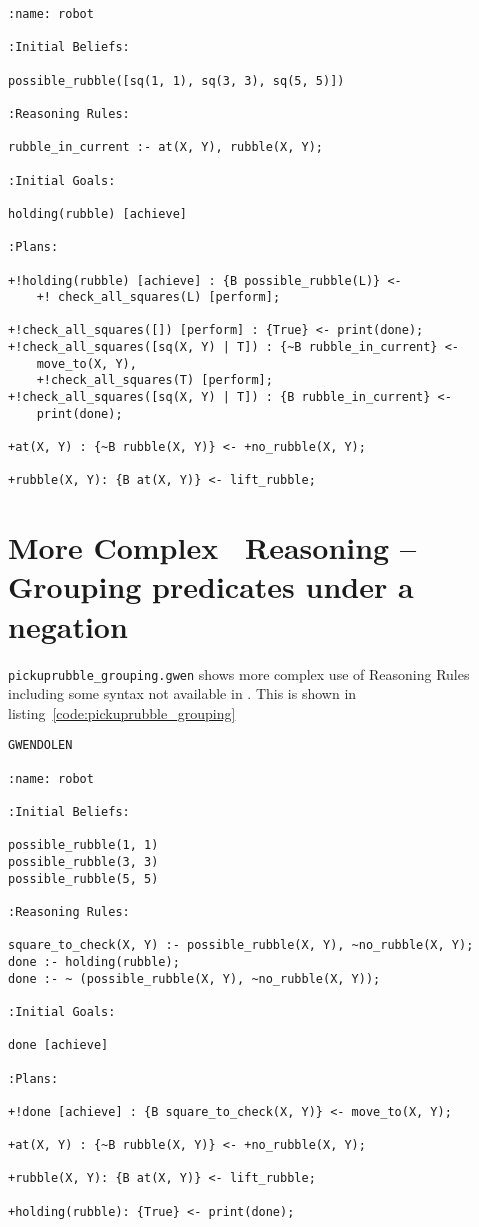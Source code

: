 \documentclass[a4]{article}
\begin{document}
\begin{lstlisting}[float,caption=Pick Up Rubble (with \prolog\ lists in Plans),basicstyle=\sffamily,style=easslisting,language=Gwendolen,label=code:pickuprubble_list2]
:name: robot

:Initial Beliefs:

possible_rubble([sq(1, 1), sq(3, 3), sq(5, 5)])

:Reasoning Rules:

rubble_in_current :- at(X, Y), rubble(X, Y);

:Initial Goals:

holding(rubble) [achieve]

:Plans:

+!holding(rubble) [achieve] : {B possible_rubble(L)} <- 
    +! check_all_squares(L) [perform];

+!check_all_squares([]) [perform] : {True} <- print(done);
+!check_all_squares([sq(X, Y) | T]) : {~B rubble_in_current} <- 
    move_to(X, Y), 
    +!check_all_squares(T) [perform];
+!check_all_squares([sq(X, Y) | T]) : {B rubble_in_current} <- 
    print(done);

+at(X, Y) : {~B rubble(X, Y)} <- +no_rubble(X, Y);

+rubble(X, Y): {B at(X, Y)} <- lift_rubble;
\end{lstlisting}

\section{More Complex \prolog\ Reasoning -- Grouping predicates under a negation}

\texttt{pickuprubble\_grouping.gwen} shows more complex use of Reasoning Rules including some syntax not available in \prolog.  This is shown in listing~\ref{code:pickuprubble_grouping}
\begin{lstlisting}[float,caption=Pick Up Rubble (More Complex Reasoning Rules),basicstyle=\sffamily,style=easslisting,language=Gwendolen,label=code:pickuprubble_grouping]
GWENDOLEN

:name: robot

:Initial Beliefs:

possible_rubble(1, 1)
possible_rubble(3, 3)
possible_rubble(5, 5)

:Reasoning Rules:

square_to_check(X, Y) :- possible_rubble(X, Y), ~no_rubble(X, Y);
done :- holding(rubble);
done :- ~ (possible_rubble(X, Y), ~no_rubble(X, Y));

:Initial Goals:

done [achieve]

:Plans:

+!done [achieve] : {B square_to_check(X, Y)} <- move_to(X, Y);

+at(X, Y) : {~B rubble(X, Y)} <- +no_rubble(X, Y);

+rubble(X, Y): {B at(X, Y)} <- lift_rubble;

+holding(rubble): {True} <- print(done);
\end{lstlisting}
\end{document}
